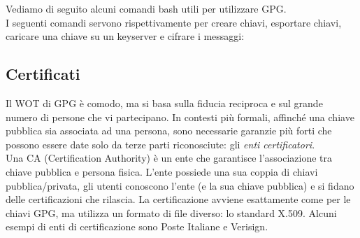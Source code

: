 Vediamo di seguito alcuni comandi bash utili per utilizzare GPG.\\
I seguenti comandi servono rispettivamente per creare chiavi, esportare chiavi, caricare una chiave su un keyserver e cifrare i messaggi:

\subsection{Certificati}
Il WOT di GPG è comodo, ma si basa sulla fiducia reciproca e sul grande numero di persone che vi partecipano. In contesti più formali, affinché una chiave pubblica sia associata ad una
persona, sono necessarie garanzie più forti che possono essere date solo da terze parti riconosciute: gli \textit{enti certificatori}.\\
Una CA (Certification Authority) è un ente che garantisce l'associazione tra chiave pubblica e persona fisica. L'ente possiede una sua coppia di chiavi pubblica/privata, gli utenti conoscono l'ente (e la sua chiave pubblica) e si fidano delle certificazioni che rilascia. La certificazione avviene esattamente come per le chiavi GPG, ma utilizza un formato di file diverso: lo standard \textsf{X.509}. Alcuni esempi di enti di certificazione sono Poste Italiane e Verisign.

